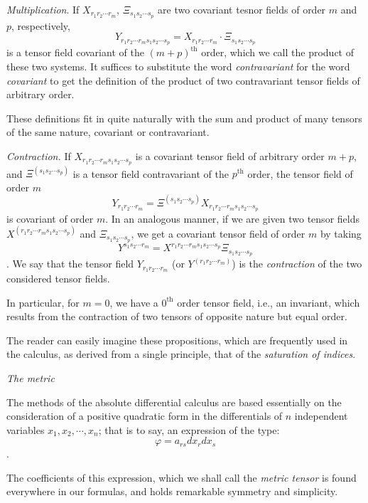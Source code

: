 \documentclass{book}
\begin{document}
\emph{Multiplication}. If $X_{r_1r_2\cdots r_m}$, $\Xi_{s_1s_2\cdots s_p}$ are two covariant tesnor fields of order $m$ and $p$, respectively, 
$$Y_{r_1r_2\cdots r_ms_1s_2\cdots s_p}=X_{r_1r_2\cdots r_m} \cdot \Xi_{s_1s_2\cdots s_p}$$
is a tensor field covariant of the $(m+p)^{\text{th}}$ order, which we call the product of these two systems. It suffices to substitute the word \emph{contravariant} for the word \emph{covariant} to get the definition of the product of two contravariant tensor fields of arbitrary order.

These definitions fit in quite naturally with the sum and product of many tensors of the same nature, covariant or contravariant.

\emph{Contraction.} If $X_{r_1r_2\cdots r_ms_1s_2\cdots s_p}$ is a covariant tensor field of arbitrary order $m+p$, and $\Xi^{(s_1s_2\cdots s_p)}$ is a tensor field contravariant of the $p^{\text{th}}$ order, the tensor field of order $m$
$$Y_{r_1r_2\cdots r_m}=\Xi^{(s_1s_2\cdots s_p)}X_{r_1r_2\cdots r_ms_1s_2\cdots s_p}$$
is covariant of order $m$. In an analogous manner, if we are given two tensor fields $X^{(r_1r_2\cdots r_ms_1s_2\cdots s_p)}$ and $\Xi_{s_1s_2\cdots s_p}$, we get a covariant tensor field of order $m$ by taking
$$Y^{s_1s_2\cdots r_m}=X^{r_1r_2\cdots r_ms_1s_2\cdots s_p}\Xi_{s_1s_2\cdots s_p}$$.
We say that the tensor field $Y_{r_1r_2\cdots r_m}$ (or $Y^{(r_1r_2\cdots r_m)}$) is the \emph{contraction} of the two considered tensor fields.

In particular, for $m=0$, we have a $0^{\text{th}}$ order tensor field, i.e., an invariant, which results from the contraction of two tensors of opposite nature but equal order.

The reader can easily imagine these propositions, which are frequently used in the calculus, as derived from a single principle, that of the \emph{saturation of indices}.

\begin{center}
	\emph{The metric}
\end{center}

The methods of the absolute differential calculus are based essentially on the consideration of a positive quadratic form in the differentials of $n$ independent variables $x_1,x_2,\cdots,x_n$; that is to say, an expression of the type:
$$\varphi=a_{rs}dx_rdx_s$$.

The coefficients of this expression, which we shall call the \emph{metric tensor} is found everywhere in our formulas, and holds remarkable symmetry and simplicity.
\end{document}
